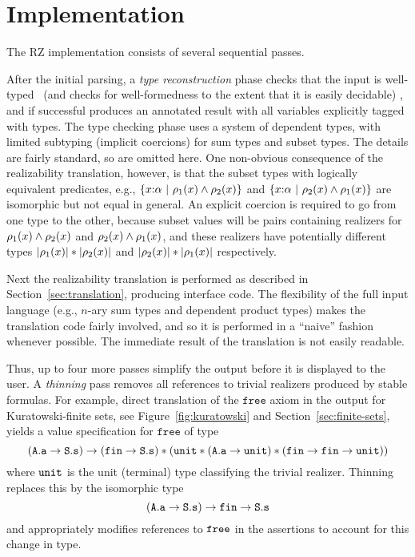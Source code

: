 \section{Implementation}
\label{sec:implementation}

The RZ implementation consists of several sequential passes.

After the initial parsing, a \emph{type reconstruction} phase checks
that the input is well-typed%
\iflong 
\ (and checks for well-formedness to the
extent that it is easily decidable)%
\fi
, and if successful produces an
annotated result with all variables explicitly tagged with types. The
type checking phase uses a system of dependent types, with limited
subtyping (implicit coercions) for sum types and subset types. 
\iflong
The
details are fairly standard, so are omitted here. One non-obvious
consequence of the realizability translation, however, is that the
subset types with logically equivalent predicates, e.g.,
$\{x{:}\alpha\ |\ \rho_1(x)\land \rho_2(x)\}$ and
$\{x{:}\alpha\ |\ \rho_2(x)\land \rho_1(x)\}$ are isomorphic
but not equal in general. An
explicit coercion is required to go from one type to the other,
because subset values will be pairs containing realizers for
$\rho_1(x)\land \rho_2(x)$ and
$\rho_2(x)\land \rho_1(x)$, and these realizers have
potentially different types $|\rho_1(x)| * |\rho_2(x)|$ and
$|\rho_2(x)| * |\rho_1(x)|$ respectively.
\fi %

Next the realizability translation is performed as described in
Section~\ref{sec:translation}, producing interface code. The
flexibility of the full input language (e.g., $n$-ary sum types and
dependent product types) makes the translation code fairly involved,
and so it is performed in a ``naive'' fashion whenever possible. The
immediate result of the translation is not easily readable.
 
Thus, up to four more passes simplify the output before it is displayed to
the user. A \emph{thinning} pass removes all references to trivial
realizers produced by stable formulas.
\iflong
For example, direct translation
of the $\mathtt{free}$ axiom in the output for Kuratowski-finite sets,
see Figure~\ref{fig:kuratowski} and Section~\ref{sec:finite-sets},
yields a value specification for $\mathtt{free}$ of type
%
\begin{equation*}
  (\mathtt{A.a} \to \mathtt{S.s}) \to 
  (\mathtt{fin} \to \mathtt{S.s}) * (\mathtt{unit} * (\mathtt{A.a} \to
  \mathtt{unit}) *
  (\mathtt{fin} \to \mathtt{fin} \to \mathtt{unit}))
\end{equation*}
%
where $\mathtt{unit}$ is the unit (terminal) type classifying the trivial
realizer. Thinning replaces this by the isomorphic type
%
\begin{equation*}
  (\mathtt{A.a} \to \mathtt{S.s}) \to \mathtt{fin} \to \mathtt{S.s}
\end{equation*}
%
and appropriately modifies references to $\mathtt{free}$ in the assertions to account for this change in type.

